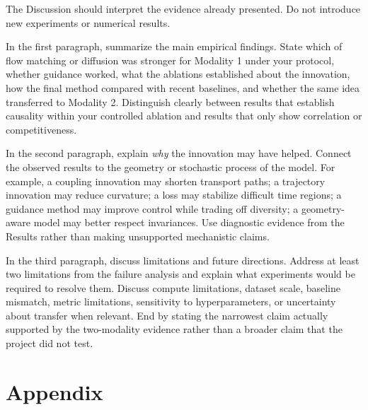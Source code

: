 \documentclass{article}
\begin{document}
The Discussion should interpret the evidence already presented. Do not introduce new experiments or numerical results.

In the first paragraph, summarize the main empirical findings. State which of flow matching or diffusion was stronger for Modality 1 under your protocol, whether guidance worked, what the ablations established about the innovation, how the final method compared with recent baselines, and whether the same idea transferred to Modality 2. Distinguish clearly between results that establish causality within your controlled ablation and results that only show correlation or competitiveness.

In the second paragraph, explain \emph{why} the innovation may have helped. Connect the observed results to the geometry or stochastic process of the model. For example, a coupling innovation may shorten transport paths; a trajectory innovation may reduce curvature; a loss may stabilize difficult time regions; a guidance method may improve control while trading off diversity; a geometry-aware model may better respect invariances. Use diagnostic evidence from the Results rather than making unsupported mechanistic claims.

In the third paragraph, discuss limitations and future directions. Address at least two limitations from the failure analysis and explain what experiments would be required to resolve them. Discuss compute limitations, dataset scale, baseline mismatch, metric limitations, sensitivity to hyperparameters, or uncertainty about transfer when relevant. End by stating the narrowest claim actually supported by the two-modality evidence rather than a broader claim that the project did not test.




\newpage
\appendix
\section{Appendix}

\renewcommand{\thetable}{S\arabic{table}}
\setcounter{table}{0}
\renewcommand{\thefigure}{S\arabic{figure}}
\setcounter{figure}{0}
\end{document}
